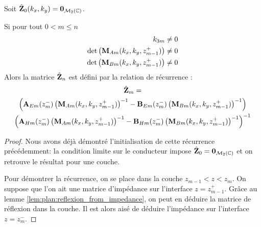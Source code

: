         \begin{thm}
            \label{thm:imp:fourier:plan:multi_couche}
            Soit \(\hat {\mathbf{Z}}_0(k_x,k_y) = \mathbf{0}_{\mathcal{M}_2(\mathbb C)}\).

            Si pour tout \(0 < m \le n\)
            \begin{align}
                k_{3m} &\not = 0
                \\
                \det\left(\mathbf{M}_{Am}(k_x,k_y,z_{m-1}^+)\right) &\not = 0 
                \\
                \det\left(\mathbf{M}_{Bm}(k_x,k_y,z_{m-1}^+)\right) &\not = 0
            \end{align}
            Alors la matrice \(\hat {\mathbf{Z}}_n\) est défini par la relation de récurrence :
            \begin{multline*}
                \hat {\mathbf{Z}}_m = \\
                \left(\mathbf{A}_{Em}(z_{m}^-)\left(\mathbf{M}_{Am}(k_x,k_y,z_{m-1}^+)\right)^{-1} - \mathbf{B}_{Em}(z_{m}^-) \left(\mathbf{M}_{Bm}(k_x,k_y,z_{m-1}^+)\right)^{-1}\right)
                \\
                \left(\mathbf{A}_{Hm}(z_{m}^-)\left(\mathbf{M}_{Am}(k_x,k_y,z_{m-1}^+)\right)^{-1} - \mathbf{B}_{Hm}(z_{m}^-) \left(\mathbf{M}_{Bm}(k_x,k_y,z_{m-1}^+)\right)^{-1}\right)^{-1}
            \end{multline*}
        \end{thm}

        \begin{proof}
            Nous avons déjà démontré l'initialisation de cette récurrence précédemment: la condition limite sur le conducteur impose \(\hat {\mathbf{Z}}_0 = \mathbf{0}_{\mathcal{M}_2(\mathbb C)}\) et on retrouve le résultat pour une couche.

            Pour démontrer la récurrence, on se place dans la couche \(z_{m-1}<z<z_m\). On suppose que l'on ait une matrice d'impédance sur l'interface \(z= z_{m-1}^+\). Grâce au lemme \ref{lem:plan:reflexion_from_impedance}, on peut en déduire la matrice de réflexion dans la couche. Il est alors aisé de déduire l'impédance sur l'interface \(z=z_m^-\).
        \end{proof}
